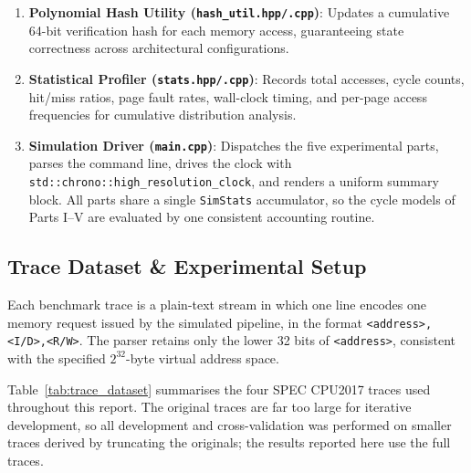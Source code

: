 \documentclass[11pt,a4paper]{article}
\begin{document}
\begin{enumerate}
\begin{itemize}
    \end{itemize}
    \item \textbf{Polynomial Hash Utility (\texttt{hash\_util.hpp/.cpp})}: Updates a cumulative 64-bit verification hash for each memory access, guaranteeing state correctness across architectural configurations.
    \item \textbf{Statistical Profiler (\texttt{stats.hpp/.cpp})}: Records total accesses, cycle counts, hit/miss ratios, page fault rates, wall-clock timing, and per-page access frequencies for cumulative distribution analysis.
    \item \textbf{Simulation Driver (\texttt{main.cpp})}: Dispatches the five experimental parts, parses the command line, drives the clock with \texttt{std::chrono::high\_resolution\_clock}, and renders a uniform summary block. All parts share a single \texttt{SimStats} accumulator, so the cycle models of Parts I--V are evaluated by one consistent accounting routine.
\end{enumerate}

\subsection{Trace Dataset \& Experimental Setup}
Each benchmark trace is a plain-text stream in which one line encodes one memory request issued by the simulated pipeline, in the format \texttt{<address>,<I/D>,<R/W>}. The parser retains only the lower 32 bits of \texttt{<address>}, consistent with the specified $2^{32}$-byte virtual address space.

Table~\ref{tab:trace_dataset} summarises the four SPEC CPU2017 traces used throughout this report. The original traces are far too large for iterative development, so all development and cross-validation was performed on smaller traces derived by truncating the originals; the results reported here use the full traces.

\begin{table}[h]
\centering
\caption{Benchmark Trace Dataset Characteristics}
\label{tab:trace_dataset}
\end{table}
\end{document}
